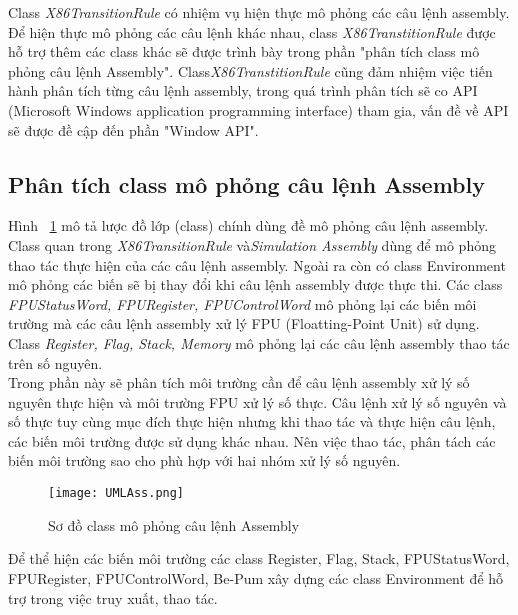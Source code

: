 		Class  \textit{X86TransitionRule} có nhiệm vụ hiện thực mô phỏng các câu lệnh assembly. Để hiện thực mô phỏng các câu lệnh khác nhau, class \textit{X86TranstitionRule} được hỗ trợ thêm các class khác sẽ được trình bày trong phần "phân tích class mô phỏng câu lệnh Assembly". Class\textit{X86TranstitionRule} cũng đảm nhiệm việc tiến hành phân tích từng câu lệnh assembly, trong quá trình phân tích sẽ  co API (Microsoft Windows application programming interface) tham gia, vấn đề về API sẽ được đề cập đến phần "Window API".
		
		\newpage
	\subsection{Phân tích class mô phỏng câu lệnh Assembly}
	Hình ~\ref{fig:SoDoClassAss}	mô tả lược đồ lớp (class)  chính dùng đề mô phỏng câu lệnh assembly. Class quan trong \textit{X86TransitionRule} và\textit{Simulation Assembly} dùng để mô phỏng thao tác thực hiện của các câu lệnh assembly. Ngoài ra còn có class Environment mô phỏng các biến sẽ bị thay đổi khi câu lệnh assembly được thực thi. Các class \textit{FPUStatusWord, FPURegister, FPUControlWord} mô phỏng lại các biến môi trường mà các câu lệnh assembly xử lý FPU (Floatting-Point Unit) sử dụng. Class \textit{Register, Flag, Stack, Memory} mô phỏng lại các câu lệnh assembly thao tác trên số nguyên.\\
	
	Trong phần này sẽ phân tích môi trường cần để câu lệnh assembly xử lý số nguyên thực hiện và môi trường FPU xử lý số thực. Câu lệnh xử lý số nguyên và số thực tuy cùng mục đích thực hiện nhưng khi thao tác và thực hiện câu lệnh, các biến môi trường được sử dụng khác nhau. Nên việc thao tác, phân tách các biến môi trường sao cho phù hợp với hai nhóm xử lý số nguyên.	
		\begin{center}
			\begin{figure}[htp]
				\begin{center}
					\texttt{[image: UMLAss.png]}
				\end{center}
				\caption{Sơ đồ class mô phỏng câu lệnh Assembly}	
					\label{fig:SoDoClassAss}		
			\end{figure}
		\end{center}			
		
		Để thể hiện các biến môi trường các class Register, Flag, Stack, FPUStatusWord, FPURegister, FPUControlWord,  Be-Pum xây dựng các class Environment để hỗ trợ trong việc truy xuất, thao tác.
	
